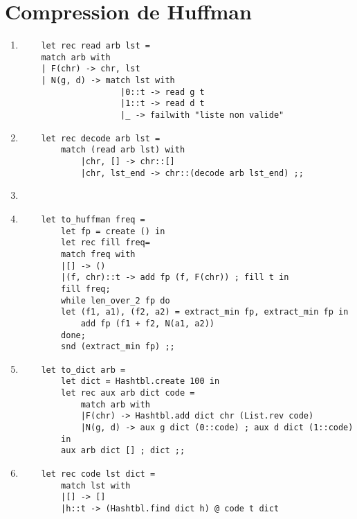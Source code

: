 \documentclass{article}
\newcommand{\image}[3]{ %
    \begin{minipage}[t]{\linewidth}
        #1
              \adjustbox{valign=t}{%
                \texttt{[image: \#3]}%
              }
    \end{minipage}}
\begin{document}
\section{Compression de Huffman}

\begin{enumerate}
    
\item \begin{verbatim}
    let rec read arb lst =
    match arb with
    | F(chr) -> chr, lst
    | N(g, d) -> match lst with
                    |0::t -> read g t
                    |1::t -> read d t
                    |_ -> failwith "liste non valide"
\end{verbatim}

\item \begin{verbatim}
    let rec decode arb lst =
        match (read arb lst) with
            |chr, [] -> chr::[]
            |chr, lst_end -> chr::(decode arb lst_end) ;;
\end{verbatim}

\item \image{\raggedright}{0.45}{img/II_3.pdf}

\item \begin{verbatim}
    let to_huffman freq =
        let fp = create () in
        let rec fill freq=
        match freq with
        |[] -> ()
        |(f, chr)::t -> add fp (f, F(chr)) ; fill t in
        fill freq;
        while len_over_2 fp do
        let (f1, a1), (f2, a2) = extract_min fp, extract_min fp in
            add fp (f1 + f2, N(a1, a2))
        done;
        snd (extract_min fp) ;;
\end{verbatim}

\item \begin{verbatim}
    let to_dict arb = 
        let dict = Hashtbl.create 100 in
        let rec aux arb dict code =
            match arb with
            |F(chr) -> Hashtbl.add dict chr (List.rev code)
            |N(g, d) -> aux g dict (0::code) ; aux d dict (1::code) 
        in
        aux arb dict [] ; dict ;;
\end{verbatim}

\item \begin{verbatim}
    let rec code lst dict =
        match lst with
        |[] -> []
        |h::t -> (Hashtbl.find dict h) @ code t dict
\end{verbatim}
\end{enumerate}
\end{document}
